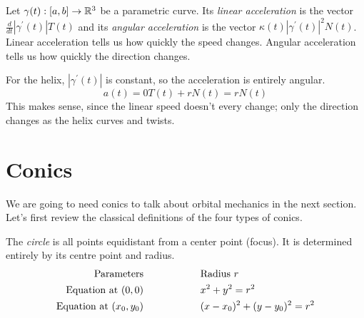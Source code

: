 \documentclass[fleqn,letterpaper]{report}
\begin{document}
\begin{defn}
Let $\gamma(t): [a,b] \rightarrow \mathbb{R}^3$ be a parametric
curve. Its \emph{linear acceleration} is the vector
$\frac{d}{dt} |\gamma^\prime(t)| T(t)$ and its \emph{angular
acceleration} is the vector $\kappa(t) |\gamma^\prime(t)|^2
N(t)$. Linear acceleration tells us how quickly the speed changes.
Angular acceleration tells us how quickly the direction
changes. 
\end{defn}

\begin{example}
For the helix, $|\gamma^\prime(t)|$ is constant, so the
acceleration is entirely angular.
\begin{equation*}
a(t) = 0 T(t) + r N(t) = r N(t)
\end{equation*}
This makes sense, since the linear speed doesn't every change;
only the direction changes as the helix curves and twists. 
\end{example}

\section{Conics}
\label{conics}

We are going to need conics to talk about orbital mechanics in
the next section. Let's first review the classical definitions
of the four types of conics.

\begin{defn}
The \emph{circle} is all points equidistant from a center point
(focus). It is determined entirely by its
centre point and radius.
\begin{align*}
\text{Parameters} \hspace{2cm} & \text{Radius } r \vspace{0.3cm} \\
\text{Equation at } (0,0) \hspace{2cm} & x^2 + y^2 = r^2
\vspace{0.3cm} \\
\text{Equation at } (x_0, y_0) \hspace{2cm} & (x-x_0)^2 +
(y-y_0)^2 = r^2 \vspace{0.3cm} \\
\end{align*}
\end{defn}
\end{document}
